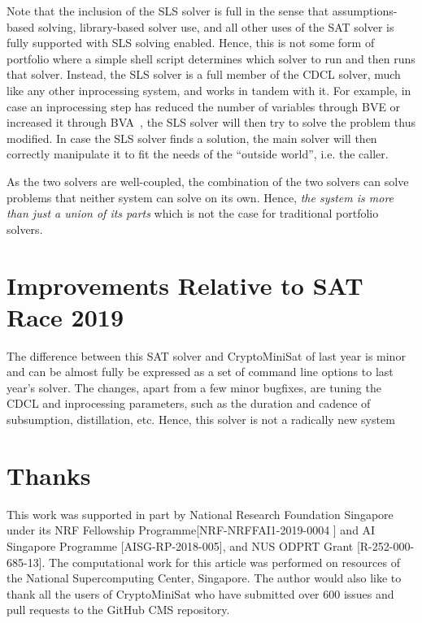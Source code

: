 \documentclass[final]{ieee}
\begin{document}
Note that the inclusion of the SLS solver is full in the sense that assumptions-based solving, library-based solver use, and all other uses of the SAT solver is fully supported with SLS solving enabled. Hence, this is not some form of portfolio where a simple shell script determines which solver to run and then runs that solver. Instead, the SLS solver is a full member of the CDCL solver, much like any other inprocessing system, and works in tandem with it. For example, in case an inprocessing step has reduced the number of variables through BVE or increased it through BVA~\cite{BVA}, the SLS solver will then try to solve the problem thus modified. In case the SLS solver finds a solution, the main solver will then correctly manipulate it to fit the needs of the ``outside world'', i.e. the caller.

As the two solvers are well-coupled, the combination of the two solvers can solve problems that neither system can solve on its own. Hence, \emph{the system is more than just a union of its parts} which is not the case for traditional portfolio solvers.

\section{Improvements Relative to SAT Race 2019}
The difference between this SAT solver and CryptoMiniSat of last year is minor and can be almost fully be expressed as a set of command line options to last year's solver. The changes, apart from a few minor bugfixes, are tuning the CDCL and inprocessing parameters, such as the duration and cadence of subsumption, distillation, etc. Hence, this solver is not a radically new system

\section{Thanks}
This work was supported in part by National Research Foundation Singapore under its NRF Fellowship Programme[NRF-NRFFAI1-2019-0004 ] and AI Singapore Programme [AISG-RP-2018-005],  and NUS ODPRT Grant [R-252-000-685-13]. The computational work for this article was performed on resources of the National Supercomputing Center, Singapore\cite{nscc}. The author would also like to thank all the users of CryptoMiniSat who have submitted over 600 issues and pull requests to the GitHub CMS repository\cite{CMS}.




\vfill
\pagebreak
\end{document}
